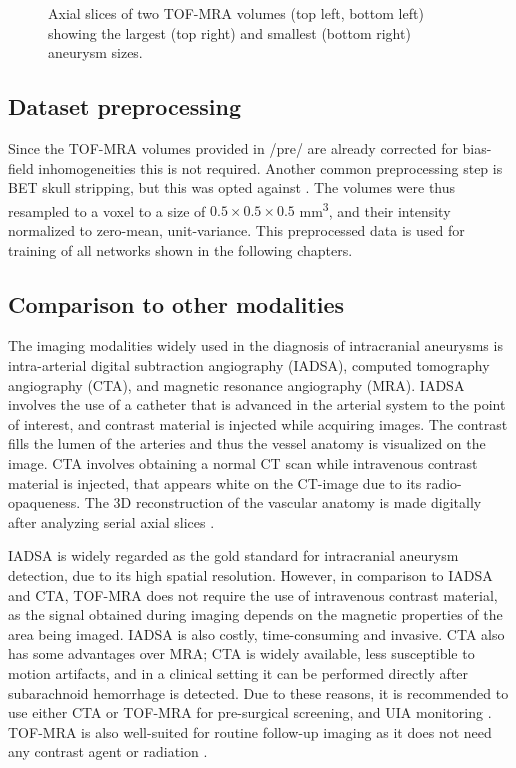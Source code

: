 \begin{figure}
\begin{subfigure}{0.9\linewidth}
	\end{subfigure}
	\caption[TOF-MRA axial slices and corresponding aneurysm label axial slices]{Axial slices of two TOF-MRA volumes (top left, bottom left) showing the largest (top right) and smallest (bottom right) aneurysm sizes.}
	\label{fig:ax-tof-aneus.png}
\end{figure}

\subsection{Dataset preprocessing}
Since the TOF-MRA volumes provided in /pre/ are already corrected for bias-field inhomogeneities this is not required. Another common preprocessing step is BET skull stripping, but this was opted against . The volumes were thus resampled to a voxel to a size of $0.5 \times 0.5 \times 0.5$ mm\textsuperscript{3}, and their intensity normalized to zero-mean, unit-variance. This preprocessed data is used for training of all networks shown in the following chapters.

\subsection{Comparison to other modalities}
The imaging modalities widely used in the diagnosis of intracranial aneurysms is intra-arterial digital subtraction angiography (IADSA), computed tomography angiography (CTA), and magnetic resonance angiography (MRA). IADSA involves the use of a catheter that is advanced in the arterial system to the point of interest, and contrast material is injected while acquiring images. The contrast fills the lumen of the arteries and thus the vessel anatomy is visualized on the image. CTA involves obtaining a normal CT scan while intravenous contrast material is injected, that appears white on the CT-image due to its radio-opaqueness. The 3D reconstruction of the vascular anatomy is made digitally after analyzing serial axial slices \cite{Keedy2006}.

IADSA is widely regarded as the gold standard for intracranial aneurysm detection, due to its high spatial resolution. However, in comparison to IADSA and CTA, TOF-MRA does not require the use of intravenous contrast material, as the signal obtained during imaging depends on the magnetic properties of the area being imaged. IADSA is also costly, time-consuming and invasive. CTA also has some advantages over MRA; CTA is widely available, less susceptible to motion artifacts, and in a clinical setting it can be performed directly after subarachnoid hemorrhage is detected. Due to these reasons, it is recommended to use either CTA or TOF-MRA for pre-surgical screening, and UIA monitoring \cite{Keedy2006, Sailer2014, Wardlaw2000}. TOF-MRA is also well-suited for routine follow-up imaging as it does not need any contrast agent or radiation \cite{Lane2015}.

